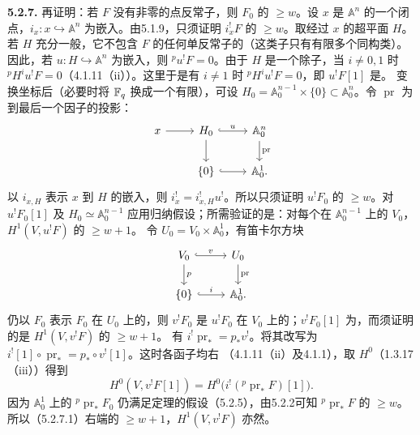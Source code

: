 \par\medskip\noindent\textbf{5.2.7.} 再证明：若 $F$ 没有非零的点反常子，则 $F_0$ 的 $\ge w$。设 $x$ 是 $\mathbb A^n$ 的一个闭点，$i_x:x\hookrightarrow\mathbb A^n$ 为嵌入。由5.1.9，只须证明 $i_x^!F$ 的 $\ge w$。取经过 $x$ 的超平面 $H$。若 $H$ 充分一般，它不包含 $F$ 的任何单反常子的（这类子只有有限多个同构类）。因此，若 $u:H\hookrightarrow\mathbb A^n$ 为嵌入，则 ${}^pu^!F=0$。由于 $H$ 是一个除子，当 $i\ne0,1$ 时 ${}^pH^iu^!F=0$（4.1.11（ii））。这里于是有 $i\ne1$ 时 ${}^pH^iu^!F=0$，即 $u^!F[1]$ 是。
变换坐标后（必要时将 $\mathbb F_q$ 换成一个有限），可设 $H_0=\mathbb A_0^{n-1}\times\{0\}\subset\mathbb A_0^n$。令 $\operatorname{pr}$ 为到最后一个因子的投影：
\[
\begin{tikzcd}[ampersand replacement=\&]
x\arrow[r]\&H_0\arrow[r,hook,"{u}"]\arrow[d]\&\mathbb A_0^n\arrow[d,"{\operatorname{pr}}"]\\
\&\{0\}\arrow[r,hook]\&\mathbb A_0^1.
\end{tikzcd}
\]
以 $i_{x,H}$ 表示 $x$ 到 $H$ 的嵌入，则 $i_x^!=i_{x,H}^!u^!$。所以只须证明 $u^!F_0$ 的 $\ge w$。对 $u^!F_0[1]$ 及 $H_0\simeq\mathbb A_0^{n-1}$ 应用归纳假设；所需验证的是：对每个在 $\mathbb A_0^{n-1}$ 上的 $V_0$，$H^1(V,u^!F)$ 的 $\ge w+1$。
令 $U_0=V_0\times\mathbb A_0^1$，有笛卡尔方块
\[
\begin{tikzcd}[ampersand replacement=\&]
V_0\arrow[r,hook,"{v}"]\arrow[d,"{p}"]\&U_0\arrow[d,"{\operatorname{pr}}"]\\
\{0\}\arrow[r,hook,"{i}"]\&\mathbb A_0^1.
\end{tikzcd}
\]
仍以 $F_0$ 表示 $F_0$ 在 $U_0$ 上的，则 $v^!F_0$ 是 $u^!F_0$ 在 $V_0$ 上的；$v^!F_0[1]$ 为，而须证明的是 $H^1(V,v^!F)$ 的 $\ge w+1$。
有 $i^!\operatorname{pr}_*=p_*v^!$。将其改写为 $i^![1]\circ\operatorname{pr}_*=p_*\circ v^![1]$。这时各函子均右 （4.1.11（ii）及4.1.1），取 $H^0$（1.3.17（iii））得到
\begin{equation*}
H^0(V,v^!F[1])=H^0\bigl(i^!({}^p\operatorname{pr}_*F)[1]\bigr).\tag{5.2.7.1}
\end{equation*}
因为 $\mathbb A_0^1$ 上的 ${}^p\operatorname{pr}_*F_0$ 仍满足定理的假设（5.2.5），由5.2.2可知 ${}^p\operatorname{pr}_*F$ 的 $\ge w$。所以（5.2.7.1）右端的 $\ge w+1$，$H^1(V,v^!F)$ 亦然。

